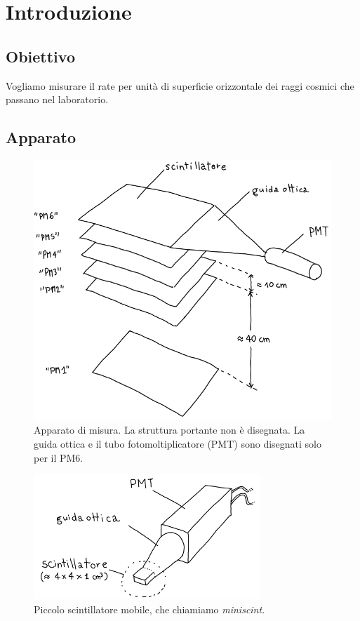 \section{Introduzione}

\subsection{Obiettivo}

Vogliamo misurare il rate per unità di superficie orizzontale
dei raggi cosmici che passano nel laboratorio.

\subsection{Apparato}

\begin{figure}
	\center
	\includegraphics[width=\textwidth]{apparato}
	\caption{\label{fig:apparato}
	Apparato di misura.
	La struttura portante non è disegnata.
	La guida ottica e il tubo fotomoltiplicatore (PMT) sono disegnati solo per il PM6.}
\end{figure}

\begin{figure}
	\center
	\includegraphics[width=23em]{miniscint}
	\caption{\label{fig:miniscint}
	Piccolo scintillatore mobile, che chiamiamo \emph{miniscint}.}
\end{figure}

